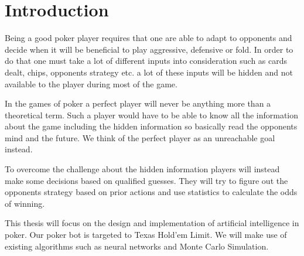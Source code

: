 \section*{Introduction}
Being a good poker player requires that one are able to adapt to opponents and decide when it will be beneficial to play aggressive, defensive or fold. In order to do that one must take a lot of different inputs into consideration such as cards dealt, chips, opponents strategy etc. a lot of these inputs will be hidden and not available to the player during most of the game.

In the games of poker a perfect player will never be anything more than a theoretical term. Such a player would have to be able to know all the information about the game including the hidden information so basically read the opponents mind and the future. We think of the perfect player as an unreachable goal instead.

To overcome the challenge about the hidden information players will instead make some decisions based on qualified guesses. They will try to figure out the opponents strategy based on prior actions and use statistics to calculate the odds of winning.

This thesis will focus on the design and implementation of artificial intelligence in poker. Our poker bot is targeted to Texas Hold'em Limit. We will make use of existing algorithms such as neural networks and Monte Carlo Simulation. 

